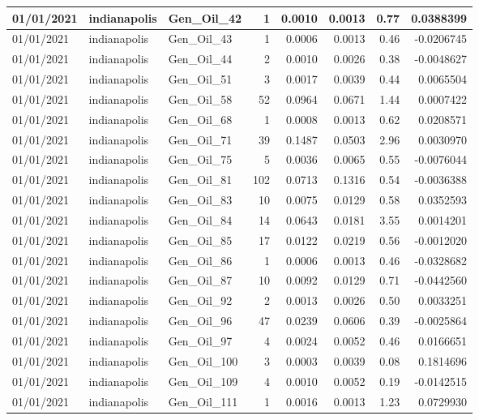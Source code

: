\documentclass[
  letterpaper,
  DIV=11,
  numbers=noendperiod]{scrartcl}
\begin{document}
\begin{tabular}{l|l|l|r|r|r|r|r}
\hline
01/01/2021 & indianapolis & Gen\_Oil\_42 & 1 & 0.0010 & 0.0013 & 0.77 & 0.0388399\\
\hline
01/01/2021 & indianapolis & Gen\_Oil\_43 & 1 & 0.0006 & 0.0013 & 0.46 & -0.0206745\\
\hline
01/01/2021 & indianapolis & Gen\_Oil\_44 & 2 & 0.0010 & 0.0026 & 0.38 & -0.0048627\\
\hline
01/01/2021 & indianapolis & Gen\_Oil\_51 & 3 & 0.0017 & 0.0039 & 0.44 & 0.0065504\\
\hline
01/01/2021 & indianapolis & Gen\_Oil\_58 & 52 & 0.0964 & 0.0671 & 1.44 & 0.0007422\\
\hline
01/01/2021 & indianapolis & Gen\_Oil\_68 & 1 & 0.0008 & 0.0013 & 0.62 & 0.0208571\\
\hline
01/01/2021 & indianapolis & Gen\_Oil\_71 & 39 & 0.1487 & 0.0503 & 2.96 & 0.0030970\\
\hline
01/01/2021 & indianapolis & Gen\_Oil\_75 & 5 & 0.0036 & 0.0065 & 0.55 & -0.0076044\\
\hline
01/01/2021 & indianapolis & Gen\_Oil\_81 & 102 & 0.0713 & 0.1316 & 0.54 & -0.0036388\\
\hline
01/01/2021 & indianapolis & Gen\_Oil\_83 & 10 & 0.0075 & 0.0129 & 0.58 & 0.0352593\\
\hline
01/01/2021 & indianapolis & Gen\_Oil\_84 & 14 & 0.0643 & 0.0181 & 3.55 & 0.0014201\\
\hline
01/01/2021 & indianapolis & Gen\_Oil\_85 & 17 & 0.0122 & 0.0219 & 0.56 & -0.0012020\\
\hline
01/01/2021 & indianapolis & Gen\_Oil\_86 & 1 & 0.0006 & 0.0013 & 0.46 & -0.0328682\\
\hline
01/01/2021 & indianapolis & Gen\_Oil\_87 & 10 & 0.0092 & 0.0129 & 0.71 & -0.0442560\\
\hline
01/01/2021 & indianapolis & Gen\_Oil\_92 & 2 & 0.0013 & 0.0026 & 0.50 & 0.0033251\\
\hline
01/01/2021 & indianapolis & Gen\_Oil\_96 & 47 & 0.0239 & 0.0606 & 0.39 & -0.0025864\\
\hline
01/01/2021 & indianapolis & Gen\_Oil\_97 & 4 & 0.0024 & 0.0052 & 0.46 & 0.0166651\\
\hline
01/01/2021 & indianapolis & Gen\_Oil\_100 & 3 & 0.0003 & 0.0039 & 0.08 & 0.1814696\\
\hline
01/01/2021 & indianapolis & Gen\_Oil\_109 & 4 & 0.0010 & 0.0052 & 0.19 & -0.0142515\\
\hline
01/01/2021 & indianapolis & Gen\_Oil\_111 & 1 & 0.0016 & 0.0013 & 1.23 & 0.0729930\\

\end{tabular}
\end{document}
